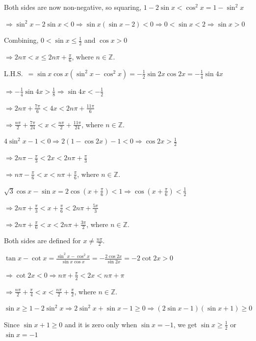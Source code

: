   Both sides are now non-negative, so squaring, $1 - 2\sin x < \cos^2x = 1 - \sin^2x$

  $\Rightarrow \sin^2x - 2\sin x < 0\Rightarrow \sin x(\sin x - 2) < 0\Rightarrow 0 < \sin x < 2\Rightarrow
  \sin x > 0$

  Combining, $0 < \sin x\leq \frac{1}{2}$ and $\cos x > 0$

  $\Rightarrow 2n\pi < x\leq 2n\pi + \frac{\pi}{6}$, where $n\in\mathbb{Z}$.
\item L.H.S.\ $= \sin x\cos x(\sin^2x - \cos^2x) = -\frac{1}{2}\sin2x\cos2x = -\frac{1}{4}\sin4x$

  $\Rightarrow -\frac{1}{4}\sin4x > \frac{1}{8}\Rightarrow \sin4x < -\frac{1}{2}$

  $\Rightarrow 2n\pi + \frac{7\pi}{6} < 4x < 2n\pi + \frac{11\pi}{6}$

  $\Rightarrow \frac{n\pi}{2} + \frac{7\pi}{24} < x < \frac{n\pi}{2} + \frac{11\pi}{24}$, where
  $n\in\mathbb{Z}$.
\item $4\sin^2x - 1 < 0\Rightarrow 2(1 - \cos2x) - 1 < 0\Rightarrow \cos2x > \frac{1}{2}$

  $\Rightarrow 2n\pi - \frac{\pi}{3} < 2x < 2n\pi + \frac{\pi}{3}$

  $\Rightarrow n\pi - \frac{\pi}{6} < x < n\pi + \frac{\pi}{6}$, where $n\in\mathbb{Z}$.
\item $\sqrt{3}\cos x - \sin x = 2\cos\left(x + \frac{\pi}{6}\right) < 1\Rightarrow \cos\left(x +
  \frac{\pi}{6}\right) < \frac{1}{2}$

  $\Rightarrow 2n\pi + \frac{\pi}{3} < x + \frac{\pi}{6} < 2n\pi + \frac{5\pi}{3}$

  $\Rightarrow 2n\pi + \frac{\pi}{6} < x < 2n\pi + \frac{3\pi}{2}$, where $n\in\mathbb{Z}$.
\item Both sides are defined for $x\neq \frac{n\pi}{2}$.

  $\tan x - \cot x = \frac{\sin^2x - \cos^2x}{\sin x\cos x} = -\frac{2\cos2x}{\sin2x} = -2\cot2x > 0$

  $\Rightarrow \cot2x < 0\Rightarrow n\pi + \frac{\pi}{2} < 2x < n\pi + \pi$

  $\Rightarrow \frac{n\pi}{2} + \frac{\pi}{4} < x < \frac{n\pi}{2} + \frac{\pi}{2}$, where $n\in\mathbb{Z}$.
\item $\sin x\geq 1 - 2\sin^2x\Rightarrow 2\sin^2x + \sin x - 1\geq 0\Rightarrow (2\sin x - 1)(\sin x + 1)\geq 0$

  Since $\sin x + 1\geq 0$ and it is zero only when $\sin x = -1$, we get $\sin x\geq \frac{1}{2}$ or $\sin x
  = -1$


